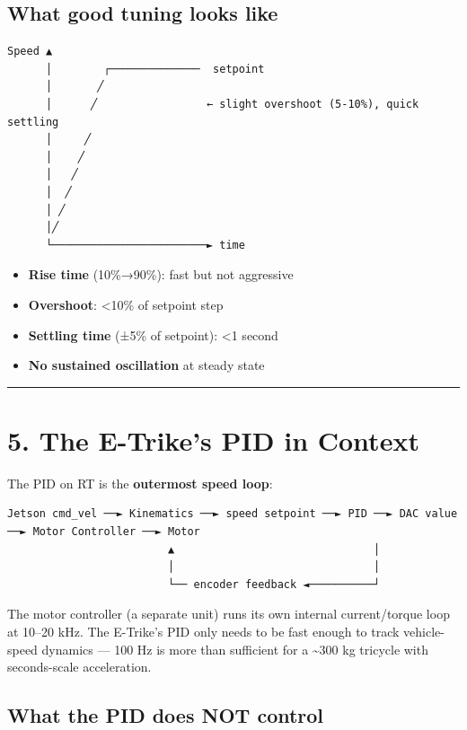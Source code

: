 \documentclass[12pt,a4paper,oneside]{report}
\providecommand{\tightlist}{\setlength{\itemsep}{0pt}\setlength{\parskip}{0pt}}
\begin{document}
\subsection{What good tuning looks like}\label{what-good-tuning-looks-like}

\begin{verbatim}
Speed ▲
      │        ┌──────────────  setpoint
      │       ╱
      │      ╱                 ← slight overshoot (5-10%), quick settling
      │     ╱
      │    ╱
      │   ╱
      │  ╱
      │ ╱
      │╱
      └────────────────────────► time
\end{verbatim}

\begin{itemize}
\tightlist
\item
  \textbf{Rise time} (10\%→90\%): fast but not aggressive
\item
  \textbf{Overshoot}: \textless10\% of setpoint step
\item
  \textbf{Settling time} (±5\% of setpoint): \textless1 second
\item
  \textbf{No sustained oscillation} at steady state
\end{itemize}

\begin{center}\rule{0.5\linewidth}{0.5pt}\end{center}

\section{5. The E-Trike's PID in Context}\label{the-e-trikes-pid-in-context}

The PID on RT is the \textbf{outermost speed loop}:

\begin{verbatim}
Jetson cmd_vel ──► Kinematics ──► speed setpoint ──► PID ──► DAC value ──► Motor Controller ──► Motor
                         ▲                               │
                         │                               │
                         └── encoder feedback ◄──────────┘
\end{verbatim}

The motor controller (a separate unit) runs its own internal current/torque loop
at 10--20 kHz. The E-Trike's PID only needs to be fast enough to track
vehicle-speed dynamics --- 100 Hz is more than sufficient for a
\textasciitilde300 kg tricycle with seconds-scale acceleration.

\subsection{What the PID does NOT control}\label{what-the-pid-does-not-control}
\end{document}
